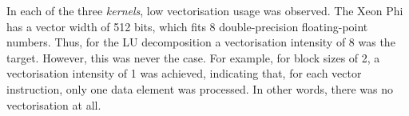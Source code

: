 \par{In each of the three \emph{kernels}, low vectorisation usage was observed. 
    The Xeon Phi has a vector width of 512 bits, which fits 8 double-precision 
    floating-point numbers. Thus, for the LU decomposition a vectorisation 
    intensity of 8 was the target. However, this was never the case. For example, 
    for block sizes of 2, a vectorisation intensity of 1 was achieved, 
    indicating that, for each vector instruction, only one data element was 
    processed. In other words, there was no vectorisation at all.}
